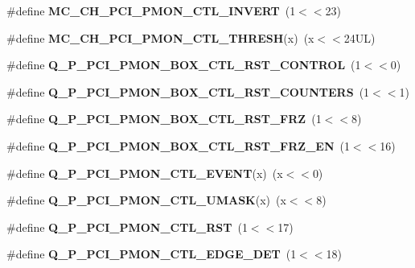 \begin{DoxyCompactItemize}
\item 
\#define {\bfseries M\+C\+\_\+\+C\+H\+\_\+\+P\+C\+I\+\_\+\+P\+M\+O\+N\+\_\+\+C\+T\+L\+\_\+\+I\+N\+V\+E\+RT}~(1$<$$<$23)\label{types_8h_a1e236122a4282b5013bb6a13762ddc19}

\item 
\#define {\bfseries M\+C\+\_\+\+C\+H\+\_\+\+P\+C\+I\+\_\+\+P\+M\+O\+N\+\_\+\+C\+T\+L\+\_\+\+T\+H\+R\+E\+SH}(x)~(x$<$$<$24\+U\+L)\label{types_8h_a4703fc1a4abb93c3da21b88a6c1bdffa}

\item 
\#define {\bfseries Q\+\_\+\+P\+\_\+\+P\+C\+I\+\_\+\+P\+M\+O\+N\+\_\+\+B\+O\+X\+\_\+\+C\+T\+L\+\_\+\+R\+S\+T\+\_\+\+C\+O\+N\+T\+R\+OL}~(1$<$$<$0)\label{types_8h_aec103c54b1ec85bc8a8f517432f6695f}

\item 
\#define {\bfseries Q\+\_\+\+P\+\_\+\+P\+C\+I\+\_\+\+P\+M\+O\+N\+\_\+\+B\+O\+X\+\_\+\+C\+T\+L\+\_\+\+R\+S\+T\+\_\+\+C\+O\+U\+N\+T\+E\+RS}~(1$<$$<$1)\label{types_8h_afa4a9494135a4a4743aeda0be9692a18}

\item 
\#define {\bfseries Q\+\_\+\+P\+\_\+\+P\+C\+I\+\_\+\+P\+M\+O\+N\+\_\+\+B\+O\+X\+\_\+\+C\+T\+L\+\_\+\+R\+S\+T\+\_\+\+F\+RZ}~(1$<$$<$8)\label{types_8h_ad2ff6676277fb195a75028cdf248a9d5}

\item 
\#define {\bfseries Q\+\_\+\+P\+\_\+\+P\+C\+I\+\_\+\+P\+M\+O\+N\+\_\+\+B\+O\+X\+\_\+\+C\+T\+L\+\_\+\+R\+S\+T\+\_\+\+F\+R\+Z\+\_\+\+EN}~(1$<$$<$16)\label{types_8h_a5cab64dd7d211e1721a9bdc68db81106}

\item 
\#define {\bfseries Q\+\_\+\+P\+\_\+\+P\+C\+I\+\_\+\+P\+M\+O\+N\+\_\+\+C\+T\+L\+\_\+\+E\+V\+E\+NT}(x)~(x$<$$<$0)\label{types_8h_ab7f3a6b3342d5c302104b7842987b5b8}

\item 
\#define {\bfseries Q\+\_\+\+P\+\_\+\+P\+C\+I\+\_\+\+P\+M\+O\+N\+\_\+\+C\+T\+L\+\_\+\+U\+M\+A\+SK}(x)~(x$<$$<$8)\label{types_8h_adb49550b5c697b728cca4761126f41d7}

\item 
\#define {\bfseries Q\+\_\+\+P\+\_\+\+P\+C\+I\+\_\+\+P\+M\+O\+N\+\_\+\+C\+T\+L\+\_\+\+R\+ST}~(1$<$$<$17)\label{types_8h_abc1887d2528818b68ba13e34d5a575a1}

\item 
\#define {\bfseries Q\+\_\+\+P\+\_\+\+P\+C\+I\+\_\+\+P\+M\+O\+N\+\_\+\+C\+T\+L\+\_\+\+E\+D\+G\+E\+\_\+\+D\+ET}~(1$<$$<$18)\label{types_8h_a129f0786cdfaa6d9a5aa7ae2340ae2ba}


\end{DoxyCompactItemize}
